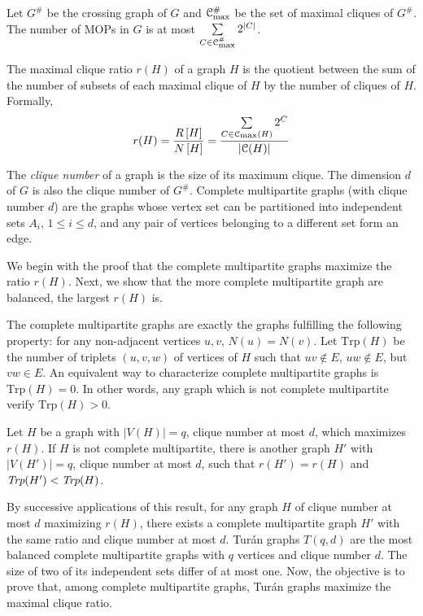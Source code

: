 \documentclass[a4paper,UKenglish,numberwithinsect,cleveref, autoref]{lipics-v2021}
\newcommand{\card}[1]{\left| #1 \right|}
\newcommand{\mcalc}{\mathcal{C}}
\newcommand{\mcalcm}{\mathcal{C}_{\mbox{\scriptsize{max}}}}
\newcommand{\trp}{\mbox{Trp}}
\begin{document}
\begin{corollary}[\ref{co:mop_crossing}]
Let $G^{\#}$ be the crossing graph of $G$ and $\mcalcm^{\#}$ be the set of maximal cliques of $G^{\#}$. The number of MOPs in $G$ is at most $\sum\limits_{C \in \mcalcm^{\#}} 2^{\card{C}}$.
\label{co:mop_crossing_teaser}
\end{corollary}

\begin{definition}
The maximal clique ratio $r(H)$ of a graph $H$ is the quotient between the sum of the number of subsets of each maximal clique of $H$ by the number of cliques of $H$. Formally,
\[
r(H) = \frac{R\left[ H\right]}{N\left[ H\right]} = \frac{\sum\limits_{C \in \mcalcm(H)} 2^{C}}{\card{\mcalc(H)}}
\]
\end{definition}

The \textit{clique number} of a graph is the size of its maximum clique. The dimension $d$ of $G$ is also the clique number of $G^{\#}$. Complete multipartite graphs (with clique number $d$) are the graphs whose vertex set can be partitioned into independent sets $A_i$, $1\le i\le d$, and any pair of vertices belonging to a different set form an edge.

We begin with the proof that the complete multipartite graphs maximize the ratio $r(H)$. Next, we show that the more complete multipartite graph are balanced, the largest $r(H)$ is.

The complete multipartite graphs are exactly the graphs fulfilling the following property: for any non-adjacent vertices $u,v$, $N(u)=N(v)$. Let $\trp(H)$ be the number of triplets $(u,v,w)$ of vertices of $H$ such that $uv\notin E$, $uw \notin E$, but $vw \in E$. An equivalent way to characterize complete multipartite graphs is $\trp(H) = 0$. In other words, any graph which is not complete multipartite verify $\trp(H) > 0$. 

\begin{theorem}[\ref{th:complete_multi}]
Let $H$ be a graph with $\card{V(H)} = q$, clique number at most $d$, which maximizes $r(H)$. If $H$ is not complete multipartite, there is another graph $H'$ with $\card{V(H')} = q$, clique number at most $d$, such that $r(H') = r(H)$ and $\emph{Trp}(H') < \emph{Trp}(H)$. 
\label{th:complete_multi_teaser}
\end{theorem}

By successive applications of this result, for any graph $H$ of clique number at most $d$ maximizing $r(H)$, there exists a complete multipartite graph $H'$ with the same ratio and clique number at most $d$. 
Tur\'an graphs $T(q,d)$ are the most balanced complete multipartite graphs with $q$ vertices and clique number $d$. The size of two of its independent sets differ of at most one. Now, the objective is to prove that, among complete multipartite graphs, Tur\'an graphs maximize the maximal clique ratio.
\end{document}
